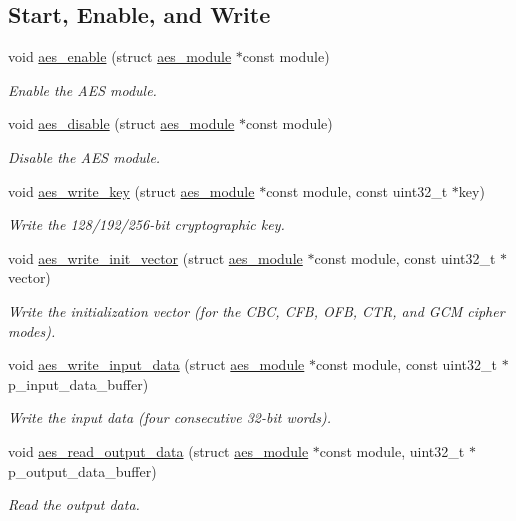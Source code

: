 \subsection*{Start, Enable, and Write}
\begin{DoxyCompactItemize}
\item 
void \hyperlink{group__asfdoc__sam0__drivers__aes__group_gae41549e7221a99c62f673c65e2f5ff03}{aes\+\_\+enable} (struct \hyperlink{structaes__module}{aes\+\_\+module} $\ast$const module)
\begin{DoxyCompactList}\small\item\em Enable the A\+E\+S module. \end{DoxyCompactList}\item 
void \hyperlink{group__asfdoc__sam0__drivers__aes__group_gab08f123acee91e3544140b8c6df7b623}{aes\+\_\+disable} (struct \hyperlink{structaes__module}{aes\+\_\+module} $\ast$const module)
\begin{DoxyCompactList}\small\item\em Disable the A\+E\+S module. \end{DoxyCompactList}\item 
void \hyperlink{group__asfdoc__sam0__drivers__aes__group_ga736388ff9633a0549299a5e16e048f57}{aes\+\_\+write\+\_\+key} (struct \hyperlink{structaes__module}{aes\+\_\+module} $\ast$const module, const uint32\+\_\+t $\ast$key)
\begin{DoxyCompactList}\small\item\em Write the 128/192/256-\/bit cryptographic key. \end{DoxyCompactList}\item 
void \hyperlink{group__asfdoc__sam0__drivers__aes__group_ga0060dabc9035de262a49d8341079f344}{aes\+\_\+write\+\_\+init\+\_\+vector} (struct \hyperlink{structaes__module}{aes\+\_\+module} $\ast$const module, const uint32\+\_\+t $\ast$vector)
\begin{DoxyCompactList}\small\item\em Write the initialization vector (for the C\+B\+C, C\+F\+B, O\+F\+B, C\+T\+R, and G\+C\+M cipher modes). \end{DoxyCompactList}\item 
void \hyperlink{group__asfdoc__sam0__drivers__aes__group_ga451967d8225c0d3632d4ebea8d9667ee}{aes\+\_\+write\+\_\+input\+\_\+data} (struct \hyperlink{structaes__module}{aes\+\_\+module} $\ast$const module, const uint32\+\_\+t $\ast$p\+\_\+input\+\_\+data\+\_\+buffer)
\begin{DoxyCompactList}\small\item\em Write the input data (four consecutive 32-\/bit words). \end{DoxyCompactList}\item 
void \hyperlink{group__asfdoc__sam0__drivers__aes__group_ga7fcad6bd802773d1f2532d4dce46c007}{aes\+\_\+read\+\_\+output\+\_\+data} (struct \hyperlink{structaes__module}{aes\+\_\+module} $\ast$const module, uint32\+\_\+t $\ast$p\+\_\+output\+\_\+data\+\_\+buffer)
\begin{DoxyCompactList}\small\item\em Read the output data. \end{DoxyCompactList}\end{DoxyCompactItemize}


